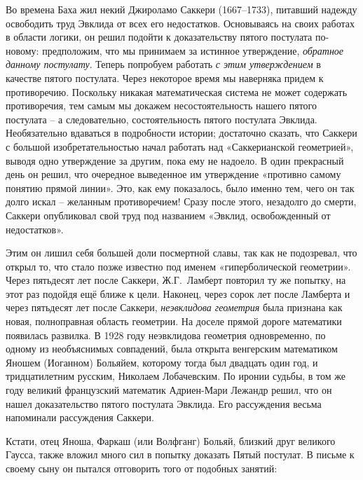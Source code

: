 \documentclass[../main.tex]{subfiles}
\begin{document}
Во времена Баха жил некий Джироламо Саккери (1667--1733), питавший надежду освободить труд Эвклида от всех его недостатков. Основываясь на своих работах в области логики, он решил подойти к доказательству пятого постулата по-новому: предположим, что мы принимаем за истинное утверждение, \emph{обратное данному постулату}. Теперь попробуем работать \emph{с этим утверждением} в качестве пятого постулата. Через некоторое время мы наверняка придем к противоречию. Поскольку никакая математическая система не может содержать противоречия, тем самым мы докажем несостоятельность нашего пятого постулата \--- а следовательно, состоятельность пятого постулата Эвклида. Необязательно вдаваться в подробности истории; достаточно сказать, что Саккери с большой изобретательностью начал работать над «Саккерианской геометрией», выводя одно утверждение за другим, пока ему не надоело. В один прекрасный день он решил, что очередное выведенное им утверждение «противно самому понятию прямой линии». Это, как ему показалось, было именно тем, чего он так долго искал \--- желанным противоречием! Сразу после этого, незадолго до смерти, Саккери опубликовал свой труд под названием «Эвклид, освобожденный от недостатков».

Этим он лишил себя большей доли посмертной славы, так как не подозревал, что открыл то, что стало позже известно под именем «гиперболической геометрии». Через пятьдесят лет после Саккери, Ж.Г.~Ламберт повторил ту же попытку, на этот раз подойдя ещё ближе к цели. Наконец, через сорок лет после Ламберта и через пятьдесят лет после Саккери, \emph{неэвклидова геометрия} была признана как новая, полноправная область геометрии. На доселе прямой дороге математики появилась развилка. В 1928 году неэвклидова геометрия одновременно, по одному из необъяснимых совпадений, была открыта венгерским математиком Яношем (Иоганном) Больяйем, которому тогда был двадцать один год, и тридцатилетним русским, Николаем Лобачевским. По иронии судьбы, в том же году великий французский математик Адриен-Мари Лежандр решил, что он нашел доказательство пятого постулата Эвклида. Его рассуждения весьма напоминали рассуждения Саккери.

Кстати, отец Яноша, Фаркаш (или Волфганг) Больяй, близкий друг великого Гаусса, также вложил много сил в попытку доказать Пятый постулат. В письме к своему сыну он пытался отговорить того от подобных занятий:
\end{document}
